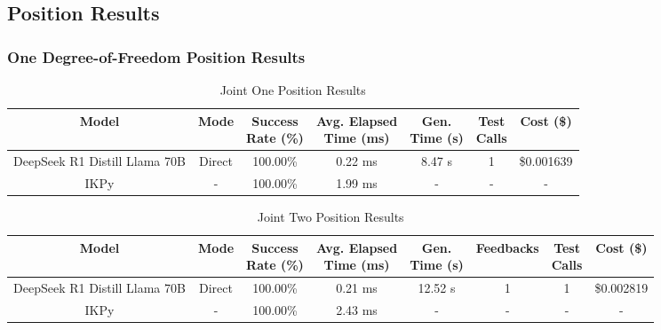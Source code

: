 \begin{landscape}

\subsection{Position Results}

\subsubsection{One Degree-of-Freedom Position Results}

\begin{table}[H]
\tiny
\renewcommand{\arraystretch}{1.2}
\caption{Joint One Position Results}
\begin{center}
\begin{tabular}{|c|c|c|c|c|c|c|}
    \hline
    \textbf{Model} & 
    \textbf{Mode} & 
    \makecell{\textbf{Success}\\\textbf{Rate (\%)}} &
    \makecell{\textbf{Avg. Elapsed}\\\textbf{Time (ms)}} &
    \makecell{\textbf{Gen.}\\\textbf{Time (s)}} &
    \makecell{\textbf{Test}\\\textbf{Calls}} &
    \textbf{Cost (\$)} \\
    \hline
    DeepSeek R1 Distill Llama 70B & Direct & 100.00\% & 0.22 ms & 8.47 s & 1 & \$0.001639 \\
    \hline
    IKPy & - & 100.00\% & 1.99 ms & - & - & - \\
    \hline
\end{tabular}
\label{Results-Position-1-1}
\end{center}
\end{table}

\begin{table}[H]
\tiny
\renewcommand{\arraystretch}{1.2}
\caption{Joint Two Position Results}
\begin{center}
\begin{tabular}{|c|c|c|c|c|c|c|c|}
    \hline
    \textbf{Model} & 
    \textbf{Mode} & 
    \makecell{\textbf{Success}\\\textbf{Rate (\%)}} &
    \makecell{\textbf{Avg. Elapsed}\\\textbf{Time (ms)}} &
    \makecell{\textbf{Gen.}\\\textbf{Time (s)}} &
    \textbf{Feedbacks} &
    \makecell{\textbf{Test}\\\textbf{Calls}} &
    \textbf{Cost (\$)} \\
    \hline
    DeepSeek R1 Distill Llama 70B & Direct & 100.00\% & 0.21 ms & 12.52 s & 1 & 1 & \$0.002819 \\
    \hline
    IKPy & - & 100.00\% & 2.43 ms & - & - & - & - \\
    \hline
\end{tabular}
\label{Results-Position-2-2}
\end{center}
\end{table}


\end{landscape}
